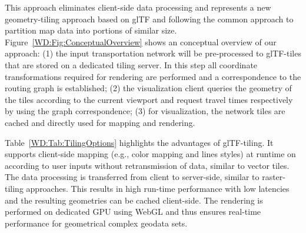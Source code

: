       This approach eliminates client-side data processing and represents a new geometry-tiling
      approach based on glTF and following the common approach to partition map data
      into portions of similar size. Figure~\ref{WD:Fig:ConceptualOverview} shows an conceptual
      overview of our approach: (1) the input transportation network will be pre-processed
      to glTF-tiles that are stored on a dedicated tiling server. In this step all
      coordinate transformations required for rendering are performed and a correspondence
      to the routing graph is established; (2) the visualization client queries the
      geometry of the tiles according to the current viewport and request travel times
      respectively by using the graph correspondence; (3) for visualization, the network
      tiles are cached and directly used for mapping and rendering.\par
      Table~\ref{WD:Tab:TilingOptions} highlights the advantages of glTF-tiling. It
      supports client-side mapping (e.g., color mapping and lines styles) at runtime
      on according to user inputs without retransmission of data, similar to vector
      tiles. The data processing is transferred from client to server-side, similar
      to raster-tiling approaches. This results in high run-time performance with
      low latencies and the resulting geometries can be cached client-side. The
      rendering is performed on dedicated GPU using WebGL and thus ensures real-time
      performance for geometrical complex geodata sets.\par


